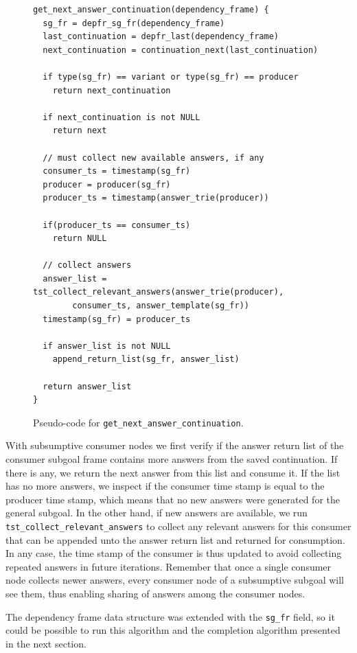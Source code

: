 \begin{figure}[ht]
\begin{Verbatim}
get_next_answer_continuation(dependency_frame) {
  sg_fr = depfr_sg_fr(dependency_frame)
  last_continuation = depfr_last(dependency_frame)
  next_continuation = continuation_next(last_continuation)
  
  if type(sg_fr) == variant or type(sg_fr) == producer
    return next_continuation
  
  if next_continuation is not NULL
    return next
  
  // must collect new available answers, if any
  consumer_ts = timestamp(sg_fr)
  producer = producer(sg_fr)
  producer_ts = timestamp(answer_trie(producer))
      
  if(producer_ts == consumer_ts)
    return NULL
        
  // collect answers
  answer_list = tst_collect_relevant_answers(answer_trie(producer),
        consumer_ts, answer_template(sg_fr))
  timestamp(sg_fr) = producer_ts
      
  if answer_list is not NULL
    append_return_list(sg_fr, answer_list)
      
  return answer_list
}
\end{Verbatim}
\caption{Pseudo-code for \texttt{get\_next\_answer\_continuation}.}
\label{fig:get_next_answer_continuation}
\end{figure}

With subsumptive consumer nodes we first verify if the answer return list of the
consumer subgoal frame contains more answers from the saved continuation. If there is
any, we return the next answer from this list and consume it. If the list has no more answers,
we inspect if the consumer time stamp is equal to the producer time stamp, which means
that no new answers were generated for the general subgoal. In the other hand, if new
answers are available, we run \texttt{tst\_collect\_relevant\_answers} to collect any
relevant answers for this consumer that can be appended unto the answer return list
and returned for consumption.
In any case, the time stamp of the consumer is thus updated to avoid collecting
repeated answers in future iterations. Remember that once a single consumer node
collects newer answers, every consumer node of a subsumptive subgoal will see them, thus
enabling sharing of answers among the consumer nodes.

The dependency frame data structure was extended with the \texttt{sg\_fr} field, so it could
be possible to run this algorithm and the completion algorithm presented in the next section.


